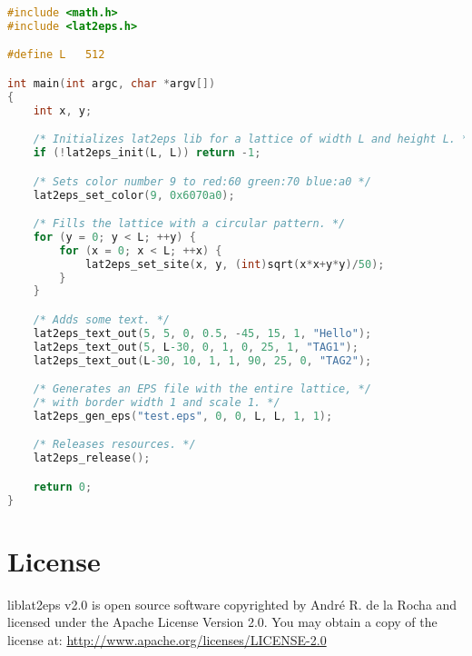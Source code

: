 \documentclass[a4paper]{article}
\begin{document}
\begin{lstlisting}[language=C]
#include <math.h>
#include <lat2eps.h>

#define L   512

int main(int argc, char *argv[])
{
	int x, y;

	/* Initializes lat2eps lib for a lattice of width L and height L. */
	if (!lat2eps_init(L, L)) return -1;

	/* Sets color number 9 to red:60 green:70 blue:a0 */
	lat2eps_set_color(9, 0x6070a0);

	/* Fills the lattice with a circular pattern. */
	for (y = 0; y < L; ++y) {
		for (x = 0; x < L; ++x) {
			lat2eps_set_site(x, y, (int)sqrt(x*x+y*y)/50);
		}
	}

	/* Adds some text. */
	lat2eps_text_out(5, 5, 0, 0.5, -45, 15, 1, "Hello");
	lat2eps_text_out(5, L-30, 0, 1, 0, 25, 1, "TAG1");
	lat2eps_text_out(L-30, 10, 1, 1, 90, 25, 0, "TAG2");

	/* Generates an EPS file with the entire lattice, */
	/* with border width 1 and scale 1. */
	lat2eps_gen_eps("test.eps", 0, 0, L, L, 1, 1); 

	/* Releases resources. */
	lat2eps_release();

	return 0;	
}
\end{lstlisting}
\bigbreak


\section{License}

liblat2eps v2.0 is open source software copyrighted by André R. de la Rocha and licensed under the Apache License Version 2.0. You may obtain a copy of the license at: \url{http://www.apache.org/licenses/LICENSE-2.0}
\end{document}
